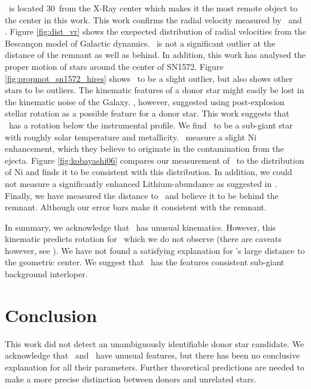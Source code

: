 \starg\ is located 30\arcsec\ from the X-Ray center which makes it the most remote object to the center in this work. This work confirms the radial velocity measured by \gh\ and \wek. Figure \ref{fig:dist_vr} shows the exepected distribution of radial velocities from the Bescan\c{c}on model of Galactic dynamics. \starg\ is not a significant outlier at the distance of the remnant as well as behind. 
In addition, this work has analysed the proper motion of stars around the center of SN1572. Figure \ref{fig:propmot_sn1572_hires} shows \starg\ to be a slight outlier, but also shows other stars to be outliers.
The kinematic features of a donor star might easily be lost in the kinematic noise of the Galaxy. \wek, however, suggested using post-explosion stellar rotation as a possible feature for a donor star. This work suggests that \starg\ has a rotation below the instrumental profile. 
We find \starg\ to be a sub-giant star with roughly solar temperature and metallicity.
\gh\ measure a slight Ni enhancement, which they believe to originate in the contamination from the ejecta. Figure \ref{fig:kobayashi06} compares our measurement of \starg\ to the distribution of Ni and finds it to be consistent with this distribution. In addition, we could not measure a significantly enhanced Lithium-abundance as suggested in \gh. 
Finally, we have measured the distance to \starg\ and believe it to be behind the remnant. Although our error bars make it consistent with the remnant.

In summary, we acknowledge that \starg\ has unusual kinematics. However, this kinematic predicts rotation for \starg\ which we do not observe (there are caveats however, see \wek). We have not  found a satisfying explanation for \starg's large distance to the geometric center. We suggest that \starg\, has the features consistent sub-giant background interloper.

\section{Conclusion}
\label{sec:conclusion}
This work did not detect an unambiguously identifiable donor star candidate. We acknowledge that \starb\ and \starg\ have unusual features, but there has been no conclusive explanation for all their parameters. Further theoretical predictions are needed to make a more precise distinction between donors and unrelated stars. 
 
